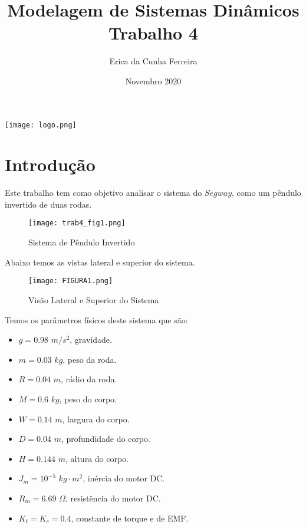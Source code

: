 \documentclass[12pt]{article}
\title{%
    Modelagem de Sistemas Dinâmicos\\
    \large Trabalho 4}
\author{Erica da Cunha Ferreira}
\date{Novembro 2020}
\begin{document}
\maketitle
{}
\vspace{8cm} %
\begin{center}
    \texttt{[image: logo.png]}
\end{center}

\newpage
\tableofcontents
\newpage
{}

\cleardoublepage{}

\section{Introdução}

\quad Este trabalho tem como objetivo analisar o sistema do $Segway$, como um pêndulo invertido de duas rodas. 

\begin{figure}[H] 
    \centering
    \texttt{[image: trab4\_fig1.png]}
    \caption{Sistema de Pêndulo Invertido}
    \label{fig:mesh1}
\end{figure}

\quad Abaixo temos as vistas lateral e superior do sistema.

\begin{figure}[H] 
    \centering
    \texttt{[image: FIGURA1.png]}
    \caption{Visão Lateral e Superior do Sistema}
    \label{fig:mesh4}
\end{figure}

Temos os parâmetros físicos deste sistema que são:

\begin{itemize}
    \item $g = 0.98$ $m/s^2$, gravidade.
    \item $m = 0.03$ $kg$, peso da roda.
    \item $R = 0.04$ $m$, rádio da roda.
    \item $M = 0.6$ $kg$, peso do corpo.
    \item $W = 0.14$ $m$, largura do corpo.
    \item $D = 0.04$ $m$, profundidade do corpo.
    \item $H = 0.144$ $m$, altura do corpo.
    \item $J_m = 10^{-5}$ $kg\cdot m^2$, inércia do motor DC.
    \item $R_m = 6.69$  $\Omega$, resistência do motor DC.
    \item $K_t = K_e = 0.4$, constante de torque e de EMF.
\end{itemize}
\end{document}

